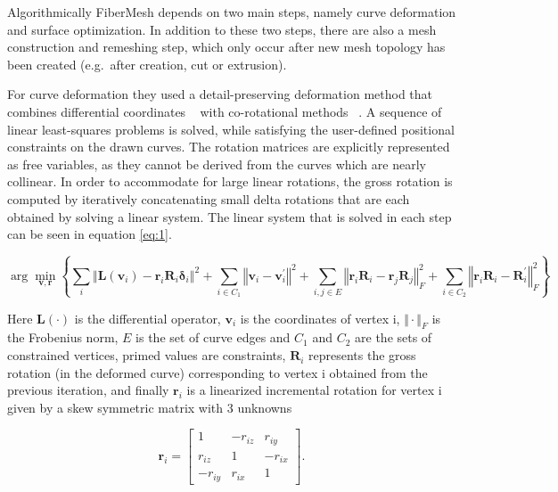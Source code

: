 Algorithmically FiberMesh depends on two main steps, namely curve deformation and surface optimization. In addition to these two steps, there are also a mesh construction and remeshing step, which only occur after new mesh topology has been created (e.g.\ after creation, cut or extrusion). 

For curve deformation they used a detail-preserving deformation method that combines differential coordinates ~\cite{Sorkine2006} with co-rotational methods ~\cite{Felippa2007}. A sequence of linear least-squares problems is solved, while satisfying the user-defined positional constraints on the drawn curves. The rotation matrices are explicitly represented as free variables, as they cannot be derived from the curves which are nearly collinear. In order to accommodate for large linear  rotations, the gross rotation is computed by iteratively concatenating small delta rotations that are each obtained by solving a linear system. The linear system that is solved in each step can be seen in equation \ref{eq:1}.  

\begin{equation} \label{eq:1}
	\arg\min_{\mathbf{v, r}} \left\lbrace \sum_{i} \left\Vert \mathbf{L}\left(\mathbf{v}_{i}\right) - \mathbf{r}_{i}\mathbf{R}_{i}\mathbf{\delta}_{i}\right\Vert^{2} + \sum_{i \in C_{1}} \left\Vert \mathbf{v}_{i} - \mathbf{v}_{i}^{'} \right\Vert^{2} + \sum_{i,j \in E}	 \left\Vert \mathbf{r}_{i}\mathbf{R}_{i} - \mathbf{r}_{j}\mathbf{R}_{j} \right\Vert^{2}_{F} + \sum_{i \in C_{2}} \left\Vert \mathbf{r}_{i}\mathbf{R}_{i} - \mathbf{R}_{i}^{'} \right\Vert^{2}_{F} \right\rbrace 
\end{equation}

Here $\mathbf{L}(\cdot)$ is the differential operator, $\mathbf{v}_{i}$ is the coordinates of vertex i, $\Vert \cdot \Vert_{F}$ is the Frobenius norm, $E$ is the set of curve edges and $C_{1}$ and $C_{2}$ are the sets of constrained vertices, primed values are constraints, $\mathbf{R}_{i}$ represents the gross rotation (in the deformed curve) corresponding to vertex i obtained from the previous iteration, and finally $\mathbf{r}_{i}$ is a linearized incremental rotation for vertex i given by a skew symmetric matrix with 3 unknowns

\begin{equation*}
\mathbf{r}_{i} = \left[ \begin{matrix}
1 & -r_{iz} & r_{iy} \\
r_{iz} & 1 & -r_{ix} \\ 
-r_{iy} & r_{ix} & 1
\end{matrix} \right].
\end{equation*}

